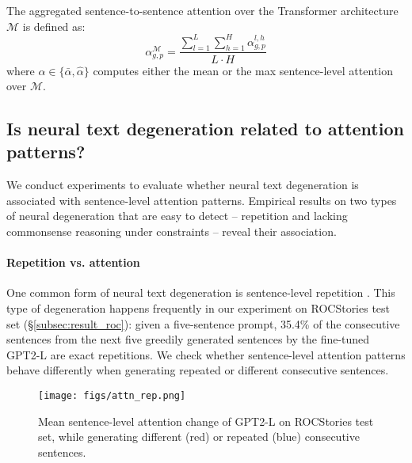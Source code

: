 \documentclass[11pt,a4paper]{article}
\begin{document}
The aggregated sentence-to-sentence attention over the Transformer architecture $\mathcal{M}$ is defined as:
\begin{equation}
\label{eq:agg_sent_to_sent_attention}
      \alpha^{\mathcal{M}}_{g,p} = \frac{\sum\limits_{l=1}^{L}\sum\limits_{h=1}^{H}\alpha^{l,h}_{g,p}}
    {L \cdot H}
\end{equation}
where $\alpha \in \{\bar{\alpha},\hat{\alpha}\}$ computes either the mean or the max sentence-level attention over $\mathcal{M}$. 

\subsection{Is neural text degeneration related to attention patterns?}\label{subsec:motivation_degeneration}
We conduct experiments to evaluate whether neural text degeneration is associated with sentence-level attention patterns. Empirical results on two types of neural degeneration that are easy to detect -- repetition and lacking commonsense reasoning under constraints -- reveal their association.%

\paragraph{Repetition vs. attention}
One common form of neural text degeneration is sentence-level repetition \citep{welleck2020neural}. This type of degeneration happens frequently in our experiment on ROCStories test set (\S \ref{subsec:result_roc}):
given a five-sentence prompt, 35.4\% of the consecutive sentences from the next five greedily generated sentences by the fine-tuned GPT2-L are exact repetitions. We check whether sentence-level attention patterns behave differently when generating repeated or different consecutive sentences.  %

\begin{figure}[t]
\centering
\texttt{[image: figs/attn\_rep.png]}
\caption{Mean sentence-level attention change of GPT2-L on ROCStories test set, while generating different (red) or repeated (blue) consecutive sentences.}
\label{fig:sentence_level_attention_repetition}
\end{figure} 
\end{document}
